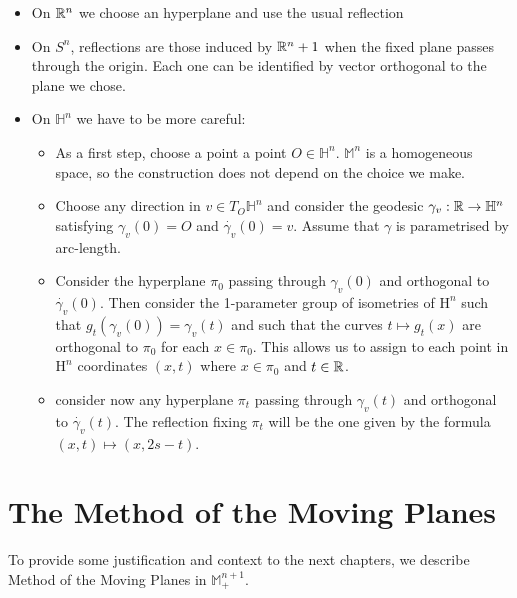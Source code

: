 \begin{itemize}	
	\item On $\mathbb{R}^n$ we choose an hyperplane and use the usual reflection 
	\item On  $S^n$, reflections are those induced by $\mathbb{R}^n+1$ when the fixed plane passes through the origin. Each one can be identified by vector orthogonal to the plane we chose. 
	\item On $\mathbb{H}^n$ we have to be more careful: 
	\begin{itemize}	
		\item As a first step, choose a point a point $O \in \mathbb{H}^n$. $\mathbb{M}^n$ is a homogeneous space, so the construction does not depend on the choice we make.
		\item Choose any direction in $v\in T_O\mathbb{H}^n$ and consider the geodesic $\gamma_v: \mathbb{R} \rightarrow \mathbb{H}^n$ satisfying $\gamma_v (0) = O$ and $\dot{\gamma_v} (0) = v$. Assume that $\gamma$ is parametrised by arc-length. 
		\item Consider the hyperplane $\pi_0$ passing through $\gamma_v(0)$ and orthogonal to  $\dot{\gamma_v}(0)$. Then consider the 1-parameter group of isometries of $\mathrm{H}^n$ such that $g_t(\gamma_v (0) )=\gamma_v (t) $ and such that the curves $t \mapsto g_t(x)$ are orthogonal to $\pi_0$ for each $x\in \pi_0$. This allows us to assign to each point in $\mathrm{H}^n$ coordinates $(x, t)$ where $x\in\pi_0$ and $t\in \mathbb{R}$.  
		\item consider now any hyperplane  $\pi_t$ passing through $\gamma_v(t)$ and orthogonal to  $\dot{\gamma_v}(t)$. The reflection fixing $\pi_t$ will be the one given by the formula $(x, t)\mapsto (x, 2s-t)$.
	\end{itemize}
\end{itemize}


\section{The Method of the Moving Planes}
\label{method moving planes}

To provide some justification and context to the next chapters, we describe Method of the Moving Planes in $\mathbb{M}^{n+1}_+$.  

